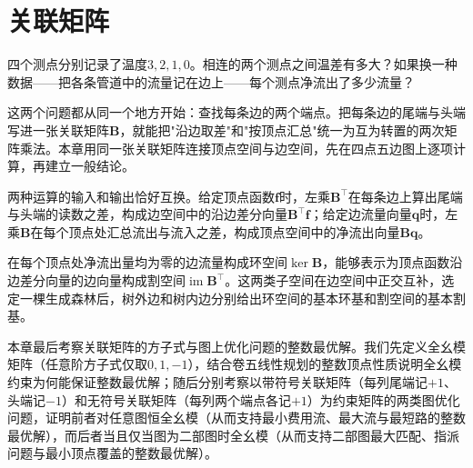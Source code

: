 \chapter{关联矩阵}
\label{chap:graph-incidence-matrix}

四个测点分别记录了温度$3,2,1,0$。相连的两个测点之间温差有多大？如果换一种数据——把各条管道中的流量记在边上——每个测点净流出了多少流量？

这两个问题都从同一个地方开始：查找每条边的两个端点。把每条边的尾端与头端写进一张关联矩阵$\bm{B}$，就能把"沿边取差"和"按顶点汇总"统一为互为转置的两次矩阵乘法。本章用同一张关联矩阵连接顶点空间与边空间，先在四点五边图上逐项计算，再建立一般结论。

两种运算的输入和输出恰好互换。给定顶点函数$\bm{f}$时，左乘$\bm{B}^\top$在每条边上算出尾端与头端的读数之差，构成边空间中的沿边差分向量$\bm{B}^\top\bm{f}$；给定边流量向量$\bm{q}$时，左乘$\bm{B}$在每个顶点处汇总流出与流入之差，构成顶点空间中的净流出向量$\bm{B}\bm{q}$。

在每个顶点处净流出量均为零的边流量构成环空间$\ker\bm{B}$，能够表示为顶点函数沿边差分向量的边向量构成割空间$\operatorname{im}\bm{B}^\top$。这两类子空间在边空间中正交互补，选定一棵生成森林后，树外边和树内边分别给出环空间的基本环基和割空间的基本割基。

本章最后考察关联矩阵的方子式与图上优化问题的整数最优解。我们先定义全幺模矩阵（任意阶方子式仅取$0,1,-1$），结合卷五线性规划的整数顶点性质说明全幺模约束为何能保证整数最优解；随后分别考察以带符号关联矩阵（每列尾端记$+1$、头端记$-1$）和无符号关联矩阵（每列两个端点各记$+1$）为约束矩阵的两类图优化问题，证明前者对任意图恒全幺模（从而支持最小费用流、最大流与最短路的整数最优解），而后者当且仅当图为二部图时全幺模（从而支持二部图最大匹配、指派问题与最小顶点覆盖的整数最优解）。





